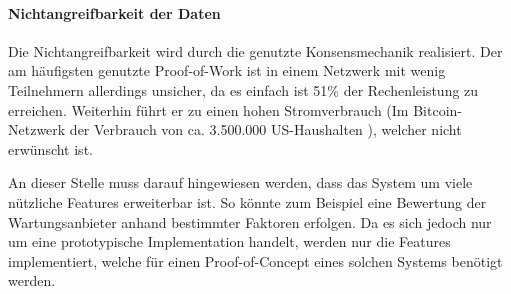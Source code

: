 \paragraph{Nichtangreifbarkeit der Daten}
Die Nichtangreifbarkeit wird durch die genutzte Konsensmechanik realisiert. Der am häufigsten genutzte Proof-of-Work ist in einem Netzwerk mit wenig Teilnehmern allerdings unsicher, da es einfach ist 51\% der Rechenleistung zu erreichen. Weiterhin führt er zu einen hohen Stromverbrauch (Im Bitcoin-Netzwerk der Verbrauch von ca. 3.500.000 US-Haushalten \cite{BitcoinEnergyConsumption}), welcher nicht erwünscht ist.

An dieser Stelle muss darauf hingewiesen werden, dass das System um viele nützliche Features erweiterbar ist. So könnte zum Beispiel eine Bewertung der Wartungsanbieter anhand bestimmter Faktoren erfolgen. Da es sich jedoch nur um eine prototypische Implementation handelt, werden nur die Features implementiert, welche für einen Proof-of-Concept eines solchen Systems benötigt werden.


